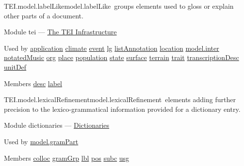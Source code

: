 \begin{reflist}
\item[]\begin{specHead}{TEI.model.labelLike}{model.labelLike} groups elements used to gloss or explain other parts of a document.\end{specHead} 
    \item[{Module}]
  tei — \hyperref[ST]{The TEI Infrastructure}
    \item[{Used by}]
  \hyperref[TEI.application]{application} \hyperref[TEI.climate]{climate} \hyperref[TEI.event]{event} \hyperref[TEI.lg]{lg} \hyperref[TEI.listAnnotation]{listAnnotation} \hyperref[TEI.location]{location} \hyperref[TEI.model.inter]{model.inter} \hyperref[TEI.notatedMusic]{notatedMusic} \hyperref[TEI.org]{org} \hyperref[TEI.place]{place} \hyperref[TEI.population]{population} \hyperref[TEI.state]{state} \hyperref[TEI.surface]{surface} \hyperref[TEI.terrain]{terrain} \hyperref[TEI.trait]{trait} \hyperref[TEI.transcriptionDesc]{transcriptionDesc} \hyperref[TEI.unitDef]{unitDef}
    \item[{Members}]
  \hyperref[TEI.desc]{desc} \hyperref[TEI.label]{label}
\end{reflist}  
\begin{reflist}
\item[]\begin{specHead}{TEI.model.lexicalRefinement}{model.lexicalRefinement} elements adding further precision to the lexico-grammatical information provided for a dictionary entry.\end{specHead} 
    \item[{Module}]
  dictionaries — \hyperref[DI]{Dictionaries}
    \item[{Used by}]
  \hyperref[TEI.model.gramPart]{model.gramPart}
    \item[{Members}]
  \hyperref[TEI.colloc]{colloc} \hyperref[TEI.gramGrp]{gramGrp} \hyperref[TEI.lbl]{lbl} \hyperref[TEI.pos]{pos} \hyperref[TEI.subc]{subc} \hyperref[TEI.usg]{usg}
\end{reflist}  
